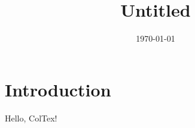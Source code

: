 \documentclass{article}
\title{Untitled}
\author{}
\date{\today}
\begin{document}
\maketitle

\section{Introduction}
Hello, ColTex!
\end{document}
